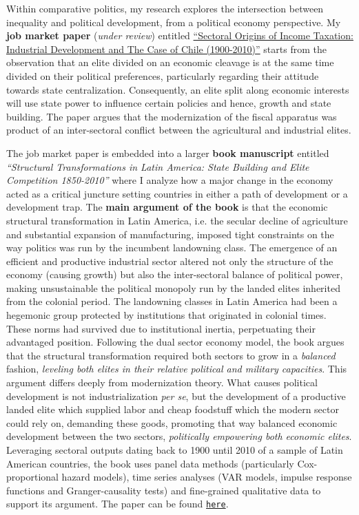 \documentclass[11pt]{letter} %
\begin{document}
\begin{letter}{}
\vspace{-1.5cm}Within comparative politics, my research explores the intersection between inequality and political development, from a political economy perspective. My {\bf job market paper} (\emph{under review}) entitled \href{https://github.com/hbahamonde/IncomeTaxAdoption/raw/master/Bahamonde_IncomeTaxAdoption.pdf}{``Sectoral Origins of Income Taxation: Industrial Development and The Case of Chile (1900-2010)''} starts from the observation that an elite divided on an economic cleavage is at the same time divided on their political preferences, particularly regarding their attitude towards state centralization. Consequently, an elite split along economic interests will use state power to influence certain policies and hence, growth and state building. The paper argues that the modernization of the fiscal apparatus was product of an inter-sectoral conflict between the agricultural and industrial elites. 

The job market paper is embedded into a larger {\bf book manuscript} entitled \emph{``Structural Transformations in Latin America: State Building and Elite Competition 1850-2010''} where I analyze how a major change in the economy acted as a critical juncture setting countries in either a path of development or a development trap. The {\bf main argument of the book} is that the economic structural transformation in Latin America, i.e. the secular decline of agriculture and substantial expansion of manufacturing, imposed tight constraints on the way politics was run by the incumbent landowning class. The emergence of an efficient and productive industrial sector altered not only the structure of the economy (causing growth) but also the inter-sectoral balance of political power, making unsustainable the political monopoly run by the landed elites inherited from the colonial period. The landowning classes in Latin America had been a hegemonic group protected by institutions that originated in colonial times. These norms had survived due to institutional inertia, perpetuating their advantaged position. Following the dual sector economy model, the book argues that the structural transformation required both sectors to grow in a \emph{balanced} fashion, \emph{leveling both elites in their relative political and military capacities}. This argument differs deeply from modernization theory. What causes political development is not industrialization \emph{per se}, but the development of a productive landed elite which supplied labor and cheap foodstuff which the modern sector could rely on, demanding these goods, promoting that way balanced economic development between the two sectors, \emph{politically empowering both economic elites}. Leveraging sectoral outputs dating back to 1900 until 2010 of a sample of Latin American countries, the book uses panel data methods (particularly Cox-proportional hazard models), time series analyses (VAR models, impulse response functions and Granger-causality tests) and fine-grained qualitative data to support its argument. The paper can be found \href{https://github.com/hbahamonde/Negative_Link_Paper/raw/master/Bahamonde_NegativeLink.pdf}{\texttt{here}}.


\end{letter}
\end{document}
